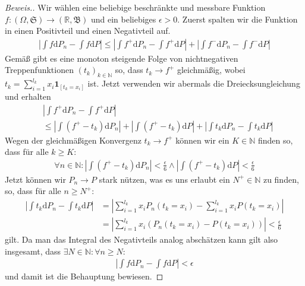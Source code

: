 \begin{proof}[Beweis.]
    Wir wählen eine beliebige beschränkte und messbare Funktion $f:(\Omega,\mathfrak{S})\to(\mathbb{R},\mathfrak{B})$ und ein beliebiges $\epsilon>0$. Zuerst spalten wir die Funktion in einen Positivteil und einen Negativteil auf.
    \begin{align*}
        \left\vert\int f\mathrm{d}P_n-\int f\mathrm{d}P\right\vert\leq\left\vert\int f^+\mathrm{d}P_n-\int f^+\mathrm{d}P\right\vert+\left\vert\int f^-\mathrm{d}P_n-\int f^-\mathrm{d}P\right\vert
    \end{align*}
    Gemäß \cite[Satz 7.30]{zbMATH06257850} gibt es eine monoton steigende Folge von nichtnegativen Treppenfunktionen $(t_k)_{k\in\mathbb{N}}$ so, dass $t_k\to f^+$ gleichmäßig, wobei $t_k=\sum_{i=1}^{l_k}x_i\mathbf{1}_{[t_k=x_i]}$ ist. Jetzt verwenden wir abermals die Dreiecksungleichung und erhalten
    \begin{align*}
        &\left\vert\int f^+\mathrm{d}P_n-\int f^+\mathrm{d}P\right\vert\\
        &\leq\left\vert\int\left(f^+-t_k\right)\mathrm{d}P_n\right\vert+\left\vert\int\left(f^+-t_k\right)\mathrm{d}P\right\vert+\left\vert\int t_k\mathrm{d}P_n-\int t_k\mathrm{d}P\right\vert
    \end{align*}
    Wegen der gleichmäßigen Konvergenz $t_k\to f^+$ können wir ein $K\in\mathbb{N}$ finden so, dass für alle $k\geq K:$
    \begin{align*}
        \forall n\in\mathbb{N}:\left\vert\int\left(f^+-t_k\right)\mathrm{d}P_n\right\vert<\frac{\epsilon}{6}\land\left\vert\int\left(f^+-t_k\right)\mathrm{d}P\right\vert<\frac{\epsilon}{6}
    \end{align*}
    Jetzt können wir $P_n\to P$ stark nützen, was es uns erlaubt ein $N^+\in\mathbb{N}$ zu finden, so, dass für alle $n\geq N^+$:
    \begin{align*}
        \left\vert\int t_k\mathrm{d}P_n-\int t_k\mathrm{d}P\right\vert&=\left\vert\sum_{i=1}^{l_k}x_iP_n(t_k=x_i)-\sum_{i=1}^{l_k} x_iP(t_k=x_i)\right\vert\\
        &=\left\vert\sum_{i=1}^{l_k}x_i\left(P_n(t_k=x_i)-P(t_k=x_i)\right)\right\vert<\frac{\epsilon}{6}
    \end{align*}
    gilt. Da man das Integral des Negativteils analog abschätzen kann gilt also insgesamt, dass $\exists N\in\mathbb{N}:\forall n\geq N:$
    \begin{align*}
        \left\vert\int f\mathrm{d}P_n-\int f\mathrm{d}P\right\vert<\epsilon
    \end{align*}
    und damit ist die Behauptung bewiesen.
\end{proof}